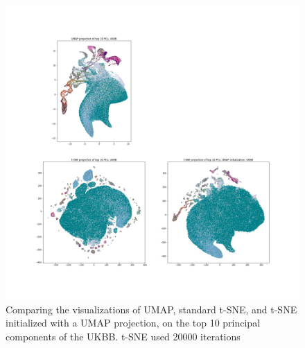 \documentclass[12pt]{pnas-new}
\begin{document}
\begin{figure}[!htb]
    \centering
    \includegraphics[width=0.95\columnwidth]{images/ukbb_tsne_umap.jpeg}
    \caption{Comparing the visualizations of UMAP, standard t-SNE, and t-SNE initialized with a UMAP projection, on the top 10 principal components of the UKBB. t-SNE used 20000 iterations}
    \label{fig:supp_tsne_umap_compare_ukbb}
\end{figure}
\end{document}
